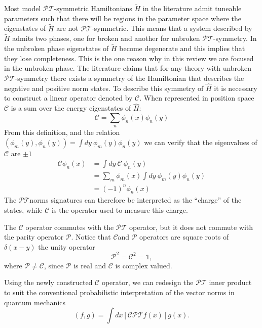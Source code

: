 \documentclass[12pt, a4paper]{report}
\newcommand\PT{\(\mathcal{PT}\)}
\newcommand\PP{\(\mathcal{P}\)}
\newcommand\CC{\(\mathcal{C}\)}
\begin{document}
Most model \PT-symmetric Hamiltonians $\tilde{H}$ in the literature admit tuneable parameters such that there will be regions in the parameter space where the eigenstates of $\tilde{H}$ are not \PT-symmetric\cite{Brody_2013}. This means that a system described by $\tilde{H}$ admits two phases, one for broken and another for unbroken \PT-symmetry. In the unbroken phase eigenstates of $\tilde{H}$ become degenerate and this implies that they lose completeness\cite{Brody_2013}. This is the one reason why in this review we are focused in the unbroken phase. The literature claims that for any theory with unbroken \PT-symmetry there exists a symmetry of the Hamiltonian that describes the negative and positive norm states. To describe this symmetry of $\hat{H}$ it is necessary to construct a linear operator denoted by \CC\cite{MustaHbeHermitian}\cite{ComplexExtension}\cite{Bender_2004}. When represented in position space \CC\: is a sum over the energy eigenstates of $\hat{H}$:
\begin{equation}\label{eq:1.8}
\mathcal{C} = \sum_n \phi_n(x)\phi_n(y)
\end{equation}
From this definition, and the relation $(\phi_m(y), \phi_n(y)) = \int dy\:\phi_m(y)\phi_n(y)$ we can verify that the eigenvalues of \CC\: are $\pm 1$
\begin{align}\label{eq:1.9}
\mathcal{C} \phi_n(x) & = \int dy\:\mathcal{C}\:\phi_n(y)\nonumber \\
& = \sum_{m}\phi_m(x)\int dy\:\phi_m(y) \phi_n(y)\nonumber \\
& = (-1)^n \phi_n(x)
\end{align}
The \PT\:norms signatures can therefore be interpreted as the ``charge'' of the states, while \CC\: is the operator used to measure this charge\cite{Bender_2004}.

The \CC\: operator commutes with the \PT\: operator, but it does not commute with the parity operator \PP. Notice that \CC\:and \PP\: operators are square roots of $\delta(x-y)$ the unity operator\cite{ComplexExtension}
\begin{equation}\label{eq:1.10}
\mathcal{P}^2 = \mathcal{C}^2 = \mathds{1}, 
\end{equation}
where $\mathcal{P} \neq \mathcal{C}$, since \PP\: is real and \CC\: is complex valued\cite{MustaHbeHermitian}\cite{Bender_2004}.

Using the newly constructed \CC\: operator, we can redesign the \PT\: inner product to suit the conventional probabilistic interpretation of the vector norms in quantum mechanics
\begin{equation}\label{eq:1.11}
\left( f, g \right ) = \int dx \left [ \mathcal{CPT} f(x) \right ] g(x).
\end{equation}
\end{document}
